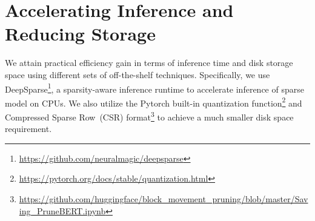 \section{Accelerating Inference and Reducing Storage}
We attain practical efficiency gain in terms of inference time and disk storage space using different sets of off-the-shelf techniques. Specifically, we use DeepSparse\footnote{\url{https://github.com/neuralmagic/deepsparse}}, a sparsity-aware inference runtime to accelerate inference of sparse model on CPUs. We also utilize the Pytorch built-in quantization function\footnote{\url{https://pytorch.org/docs/stable/quantization.html}} and Compressed Sparse Row~(CSR) format\footnote{\url{https://github.com/huggingface/block_movement_pruning/blob/master/Saving_PruneBERT.ipynb}} to achieve a much smaller disk space requirement.
